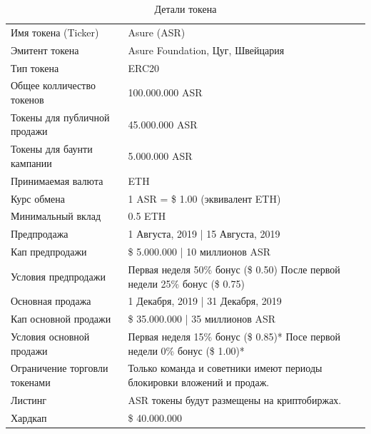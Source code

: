 \begin{table}[H]
\begin{tabular}{lp{}l}
  Имя токена (Ticker) & Asure (ASR) \\  
  Эмитент токена & Asure Foundation, Цуг, Швейцария\\
  Тип токена & ERC20\\
  Общее колличество токенов & 100.000.000 ASR \\
  Токены для публичной продажи & 45.000.000 ASR \\
  Токены для баунти кампании & 5.000.000 ASR \\
  Принимаемая валюта & ETH \\
  Курс обмена & 1 ASR = \$ 1.00 (эквивалент ETH) \\
  Минимальный вклад & 0.5 ETH \\\hline  
 
  Предпродажа & 1 Августа, 2019 | 15 Августа, 2019 \\
  Кап предпродажи & \$ 5.000.000 | 10 миллионов ASR\\
  Условия предпродажи & Первая неделя 50\% бонус (\$ 0.50) \newline
                  После первой недели 25\% бонус (\$ 0.75)\\\hline
  
  Основная продажа & 1 Декабря, 2019 | 31 Декабря, 2019 \\
  Кап основной продажи & \$ 35.000.000 | 35 миллионов ASR\\
  Условия основной продажи & Первая неделя 15\% бонус (\$ 0.85)*\newline
                    Посе первой недели 0\% бонус (\$ 1.00)*\\\hline


  Ограничение торговли токенами & Только команда и советники имеют периоды блокировки вложений и продаж. \\
  Листинг & ASR токены будут размещены на криптобиржах. \\\hline     

  
  Хардкап & \$ 40.000.000
  
\end{tabular}
\caption{\label{tab:table-name}Детали токена}
\end{table}

